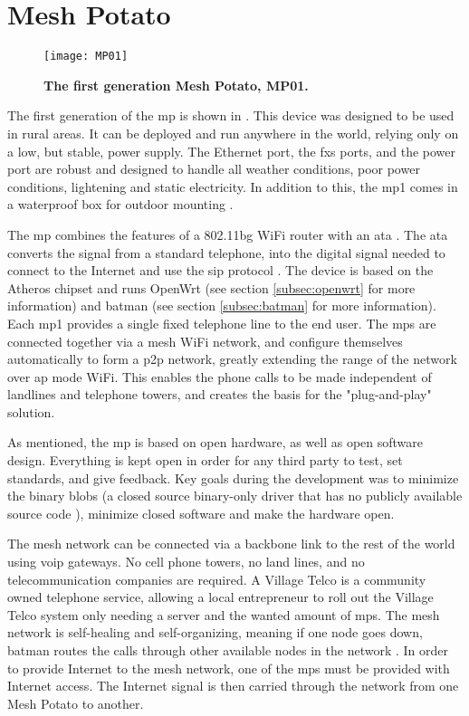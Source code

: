 \section{Mesh Potato}

\begin{figure}[b]
  \centering
      \texttt{[image: MP01]}
  \caption [MP01]{\textbf{The first generation Mesh Potato, MP01.}}
  \label{fig:MP01}
\end{figure}

The first generation of the \gls{mp} is shown in . This device was designed to be used in rural areas. It can be deployed and run anywhere in the world, relying only on a low, but stable, power supply. The Ethernet port, the \gls{fxs} ports, and the power port are robust and designed to handle all weather conditions, poor power conditions, lightening and static electricity. In addition to this, the \gls{mp1} comes in a waterproof box for outdoor mounting \cite{background}.

The \gls{mp} combines the features of a 802.11bg WiFi router with an \gls{ata} \cite{MP}. The \gls{ata} converts the signal from a standard telephone, into the digital signal needed to connect to the Internet and use the \gls{sip} protocol \cite{MParticle}. The device is based on the Atheros chipset and runs OpenWrt (see section \ref{subsec:openwrt} for more information) and \gls{batman} (see section \ref{subsec:batman} for more information). Each \gls{mp1} provides a single fixed telephone line to the end user. The \glspl{mp} are connected together via a mesh WiFi network, and configure themselves automatically to form a \gls{p2p} network, greatly extending the range of the network over \gls{ap} mode WiFi. This enables the phone calls to be made independent of landlines and telephone towers, and creates the basis for the "plug-and-play" solution. 

As mentioned, the \gls{mp} is based on open hardware, as well as open software design. Everything is kept open in order for any third party to test, set standards, and give feedback. Key goals during the development was to minimize the binary blobs (a closed source binary-only driver that has no publicly available source code \cite{binaryBolb}), minimize closed software and make the hardware open. 

The mesh network can be connected via a backbone link to the rest of the world using \gls{voip} gateways. No cell phone towers, no land lines, and no telecommunication companies are required. A Village Telco is a community owned telephone service, allowing a local entrepreneur to roll out the Village Telco system only needing a server and the wanted amount of \glspl{mp}. The mesh network is self-healing and self-organizing, meaning if one node goes down, \gls{batman} routes the calls through other available nodes in the network \cite{MPbyRowe}. In order to provide Internet to the mesh network, one of the \glspl{mp} must be provided with Internet access. The Internet signal is then carried through the network from one Mesh Potato to another. 


